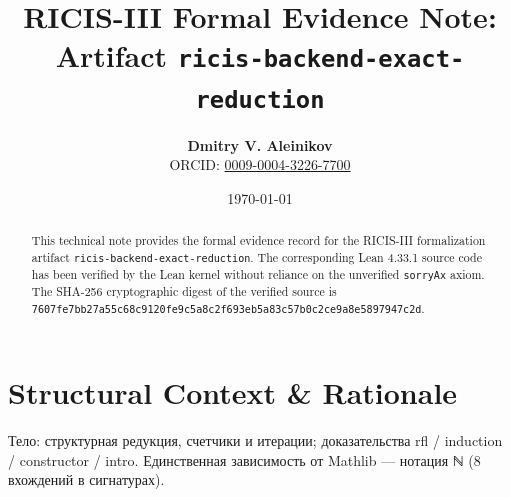 \documentclass[11pt,a4paper]{article}
\title{\textbf{RICIS-III Formal Evidence Note:\\Artifact \texttt{ricis-backend-exact-reduction}}}
\author{\textbf{Dmitry V. Aleinikov}\\ORCID: \href{https://orcid.org/0009-0004-3226-7700}{0009-0004-3226-7700}}
\date{\today}
\begin{document}
\maketitle

\begin{abstract}
This technical note provides the formal evidence record for the RICIS-III formalization artifact \texttt{ricis-backend-exact-reduction}.
The corresponding Lean 4.33.1 source code has been verified by the Lean kernel without reliance on the unverified \texttt{sorryAx} axiom.
The SHA-256 cryptographic digest of the verified source is \texttt{7607fe7bb27a55c68c9120fe9c5a8c2f693eb5a83c57b0c2ce9a8e5897947c2d}.
\end{abstract}

\section{Structural Context & Rationale}
Тело: структурная редукция, счетчики и итерации; доказательства rfl / induction / constructor / intro. Единственная зависимость от Mathlib — нотация ℕ (8 вхождений в сигнатурах).
\end{document}
